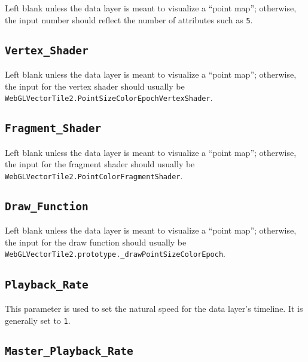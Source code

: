 \documentclass[
]{krantz}
\begin{document}
Left blank unless the data layer is meant to visualize a ``point map''; otherwise, the input number should reflect the number of attributes such as \texttt{5}.

\hypertarget{vertex_shader}{%
\subsection*{\texorpdfstring{\texttt{Vertex\_Shader}}{Vertex\_Shader}}\label{vertex_shader}}


Left blank unless the data layer is meant to visualize a ``point map''; otherwise, the input for the vertex shader should usually be \texttt{WebGLVectorTile2.PointSizeColorEpochVertexShader}.

\hypertarget{fragment_shader}{%
\subsection*{\texorpdfstring{\texttt{Fragment\_Shader}}{Fragment\_Shader}}\label{fragment_shader}}


Left blank unless the data layer is meant to visualize a ``point map''; otherwise, the input for the fragment shader should usually be \texttt{WebGLVectorTile2.PointColorFragmentShader}.

\hypertarget{draw_function}{%
\subsection*{\texorpdfstring{\texttt{Draw\_Function}}{Draw\_Function}}\label{draw_function}}


Left blank unless the data layer is meant to visualize a ``point map''; otherwise, the input for the draw function should usually be \texttt{WebGLVectorTile2.prototype.\_drawPointSizeColorEpoch}.

\hypertarget{playback_rate}{%
\subsection*{\texorpdfstring{\texttt{Playback\_Rate}}{Playback\_Rate}}\label{playback_rate}}


This parameter is used to set the natural speed for the data layer's timeline. It is generally set to \texttt{1}.

\hypertarget{master_playback_rate}{%
\subsection*{\texorpdfstring{\texttt{Master\_Playback\_Rate}}{Master\_Playback\_Rate}}\label{master_playback_rate}}
\end{document}
